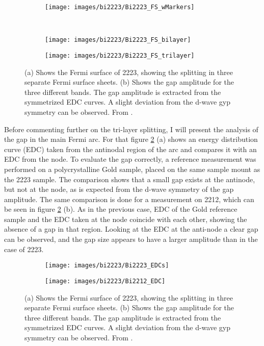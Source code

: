 \begin{figure}[t!]
	\centering
	\begin{subfigure}[b]{0.6\textwidth}
		\texttt{[image: images/bi2223/Bi2223\_FS\_wMarkers]}
		\caption{}
	\end{subfigure}
	\\
	\begin{subfigure}[b]{0.6\textwidth}
		\texttt{[image: images/bi2223/Bi2223\_FS\_bilayer]}
		\caption{}
	\end{subfigure}
	\begin{subfigure}[b]{0.3\textwidth}
		\texttt{[image: images/bi2223/Bi2223\_FS\_trilayer]}
		\caption{}
	\end{subfigure}
	\caption{(a) Shows the Fermi surface of 2223, showing the splitting in three separate Fermi surface sheets. (b) Shows the gap amplitude for the three different bands. The gap amplitude is extracted from the symmetrized EDC curves. A slight deviation from the d-wave gyp symmetry can be observed. From \cite{luo_electronic_2023}.}
	\label{fig:bi2223_fs}
\end{figure}

Before commenting further on the tri-layer splitting, I will present the analysis of the gap in the main Fermi arc.
For that figure \ref{fig:edc_comparison} (a) shows an energy distribution curve (EDC) taken from the antinodal region of the arc and compares it with an EDC from the node.
To evaluate the gap correctly, a reference measurement was performed on a polycrystalline Gold sample, placed on the same sample mount as the 2223 sample.
The comparison shows that a small gap exists at the antinode, but not at the node, as is expected from the d-wave symmetry of the gap amplitude.
The same comparison is done for a measurement on 2212, which can be seen in figure \ref{fig:edc_comparison} (b).
As in the previous case, EDC of the Gold reference sample and the EDC taken at the node coincide with each other, showing the absence of a gap in that region.
Looking at the EDC at the anti-node a clear gap can be observed, and the gap size appears to have a larger amplitude than in the case of 2223.

\begin{figure}
	\centering
	\begin{subfigure}[b]{0.49\textwidth}
		\texttt{[image: images/bi2223/Bi2223\_EDCs]}
		\caption{}
	\end{subfigure}
	\hfill
	\begin{subfigure}[b]{0.49\textwidth}
		\texttt{[image: images/bi2223/Bi2212\_EDC]}
		\caption{}
	\end{subfigure}
	\caption{(a) Shows the Fermi surface of 2223, showing the splitting in three separate Fermi surface sheets. (b) Shows the gap amplitude for the three different bands. The gap amplitude is extracted from the symmetrized EDC curves. A slight deviation from the d-wave gyp symmetry can be observed. From \cite{luo_electronic_2023}.}
	\label{fig:edc_comparison}
\end{figure}


